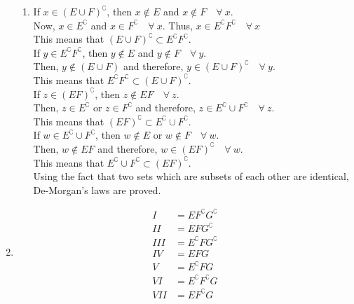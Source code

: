 \begin{enumerate}
\begin{enumerate}
		\item If $ x \in (E \cup F)^\complement $, then $ x \notin E $ and $ x \notin F  \quad \forall \ x$. \\
		Now, $ x \in E^\complement $ and $ x \in F^\complement  \quad \forall \ x$. Thus, $ x \in E^\complement F^\complement \quad \forall \ x $ \\
		This means that $ (E \cup F)^\complement \subset E^\complement F^\complement $. \\
		
		If $ y \in E^\complement F^\complement $, then $ y \notin E $ and $ y \notin F \quad \forall \ y$. \\
		Then, $ y \notin (E \cup F) $ and therefore, $ y \in (E \cup F)^\complement \quad \forall \ y$. \\
		This means that $  E^\complement F^\complement \subset (E \cup F)^\complement $. \\
		
		If $ z \in (EF)^\complement $, then $ z \notin EF \quad \forall \ z$. \\
		Then, $ z \in E^\complement$ or $ z \in F^\complement $ and therefore, $ z \in E^\complement \cup F^\complement \quad \forall \ z$. \\
		This means that $  (EF)^\complement \subset E^\complement \cup F^\complement $. \\
		
		If $ w \in E^\complement \cup F^\complement $, then $ w \notin E $ or $ w \notin F \quad \forall \ w$. \\
		Then, $ w \notin EF $ and therefore, $ w \in (EF)^\complement  \quad \forall \ w$. \\
		This means that $ E^\complement \cup F^\complement \subset (EF)^\complement$. \\
		
		Using the fact that two sets which are subsets of each other are identical, De-Morgan's laws are proved. \\
		
	\end{enumerate}
	
	\item 
		\begin{align}
			I &= E F^\complement G^\complement \\
			II &= E F G^\complement \\
			III &= E^\complement F G^\complement \\
			IV &= EFG \\
			V &= E^\complement F G \\
			VI &= E^\complement F^\complement G \\
			VII &= E F^\complement G
		\end{align}
	\\
	

\end{enumerate}

